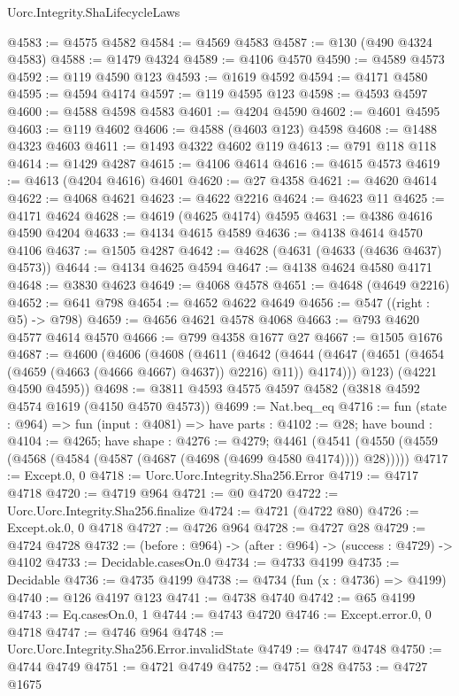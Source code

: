 \begin{lexlean}{Uorc.Integrity.ShaLifecycleLaws}
\begin{coremodule}
@4583 := @4575 @4582
@4584 := @4569 @4583
@4587 := @130 (@490 @4324 @4583)
@4588 := @1479 @4324
@4589 := @4106 @4570
@4590 := @4589 @4573
@4592 := @119 @4590 @123
@4593 := @1619 @4592
@4594 := @4171 @4580
@4595 := @4594 @4174
@4597 := @119 @4595 @123
@4598 := @4593 @4597
@4600 := @4588 @4598 @4583
@4601 := @4204 @4590
@4602 := @4601 @4595
@4603 := @119 @4602
@4606 := @4588 (@4603 @123) @4598
@4608 := @1488 @4323 @4603
@4611 := @1493 @4322 @4602 @119
@4613 := @791 @118 @118
@4614 := @1429 @4287
@4615 := @4106 @4614
@4616 := @4615 @4573
@4619 := @4613 (@4204 @4616) @4601
@4620 := @27 @4358
@4621 := @4620 @4614
@4622 := @4068 @4621
@4623 := @4622 @2216
@4624 := @4623 @11
@4625 := @4171 @4624
@4628 := @4619 (@4625 @4174) @4595
@4631 := @4386 @4616 @4590 @4204
@4633 := @4134 @4615 @4589
@4636 := @4138 @4614 @4570 @4106
@4637 := @1505 @4287
@4642 := @4628 (@4631 (@4633 (@4636 @4637) @4573))
@4644 := @4134 @4625 @4594
@4647 := @4138 @4624 @4580 @4171
@4648 := @3830 @4623
@4649 := @4068 @4578
@4651 := @4648 (@4649 @2216)
@4652 := @641 @798
@4654 := @4652 @4622 @4649
@4656 := @547 ((right : @5) -> @798)
@4659 := @4656 @4621 @4578 @4068
@4663 := @793 @4620 @4577 @4614 @4570
@4666 := @799 @4358 @1677 @27
@4667 := @1505 @1676
@4687 := @4600
    (@4606
      (@4608
        (@4611
          (@4642
            (@4644 (@4647 (@4651 (@4654 (@4659 (@4663 (@4666 @4667) @4637)) @2216) @11)) @4174)))
        @123)
      (@4221 @4590 @4595))
@4698 := @3811 @4593 @4575 @4597 @4582 (@3818 @4592 @4574 @1619 (@4150 @4570 @4573))
@4699 := Nat.beq_eq
@4716 := fun (state : @964) =>
  fun (input : @4081) =>
  have parts : @4102 := @28;
  have bound : @4104 := @4265;
  have shape : @4276 := @4279;
  @4461 (@4541 (@4550 (@4559 (@4568 (@4584 (@4587 (@4687 (@4698 (@4699 @4580 @4174)))) @28)))))
@4717 := Except.{0, 0}
@4718 := Uorc.Uorc.Integrity.Sha256.Error
@4719 := @4717 @4718
@4720 := @4719 @964
@4721 := @0 @4720
@4722 := Uorc.Uorc.Integrity.Sha256.finalize
@4724 := @4721 (@4722 @80)
@4726 := Except.ok.{0, 0} @4718
@4727 := @4726 @964
@4728 := @4727 @28
@4729 := @4724 @4728
@4732 := (before : @964) -> (after : @964) -> (success : @4729) -> @4102
@4733 := Decidable.casesOn.{0}
@4734 := @4733 @4199
@4735 := Decidable
@4736 := @4735 @4199
@4738 := @4734 (fun (x : @4736) => @4199)
@4740 := @126 @4197 @123
@4741 := @4738 @4740
@4742 := @65 @4199
@4743 := Eq.casesOn.{0, 1}
@4744 := @4743 @4720
@4746 := Except.error.{0, 0} @4718
@4747 := @4746 @964
@4748 := Uorc.Uorc.Integrity.Sha256.Error.invalidState
@4749 := @4747 @4748
@4750 := @4744 @4749
@4751 := @4721 @4749
@4752 := @4751 @28
@4753 := @4727 @1675

\end{coremodule}
\end{lexlean}
